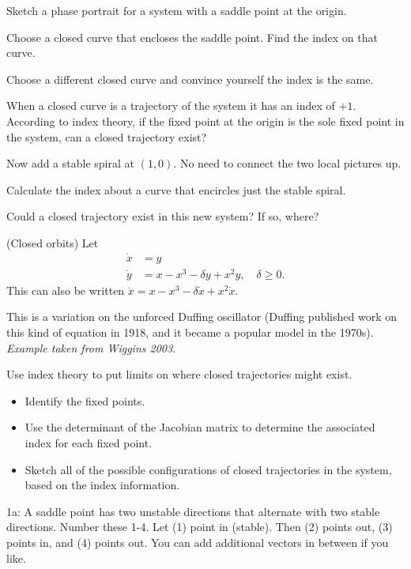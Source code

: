 \documentclass[12pt,letterpaper,noanswers]{exam}
\begin{document}
\begin{questions}
\item 
\begin{parts}
\item Sketch a phase portrait for a system with a saddle point at the origin.
\item Choose a closed curve that encloses the saddle point.  Find the index on that curve.
\item Choose a different closed curve and convince yourself the index is the same.
\item When a closed curve is a trajectory of the system it has an index of $+1$.   According to index theory, if the fixed point at the origin is the sole fixed point in the system, can a closed trajectory exist?
\item Now add a stable spiral at $(1,0)$.  No need to connect the two local pictures up.
\item Calculate the index about a curve that encircles just the stable spiral.
\item Could a closed trajectory exist in this new system?  If so, where? 
\end{parts}


\question (Closed orbits) Let \begin{align*}
\dot{x} &= y \\
\dot{y} &= x-x^3 - \delta y + x^2y, \quad \delta \geq 0.
\end{align*}
This can also be written $\ddot{x} = x- x^3 - \delta \dot{x} + x^2 \dot{x}$. 

This is a variation on the unforced Duffing oscillator (Duffing published work on this kind of equation in 1918, and it became a popular model in the 1970s).  \emph{Example taken from Wiggins 2003}.

Use index theory to put limits on where closed trajectories might exist.
\begin{itemize}
\item Identify the fixed points.
\item Use the determinant of the Jacobian matrix to determine the associated index for each fixed point.
\item Sketch all of the possible configurations of closed trajectories in the system, based on the index information.
\end{itemize}
\end{questions}

\eject

1a: A saddle point has two unstable directions that alternate with two stable directions.  Number these 1-4.  Let (1) point in (stable).  Then (2) points out, (3) points in, and (4) points out.  You can add additional vectors in between if you like.
\end{document}
